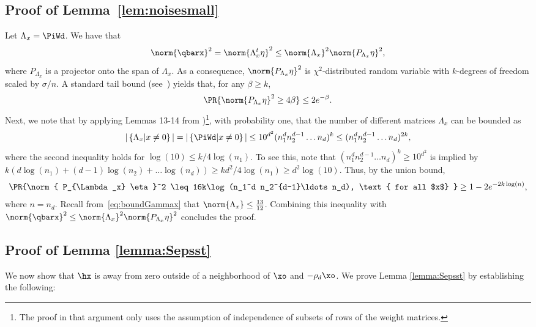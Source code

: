 

\subsection{Proof of Lemma~\ref{lem:noisesmall}}

Let $\Lambda_x = \PiWd$. 
We have that
\[
\norm{\qbarx}^2
=
\norm{ \Lambda_x^t \eta}^2
\leq
\norm{\Lambda_x}^2
\norm{ P_{\Lambda_x} \eta}^2,
\]
where $P_{\Lambda_x}$ is a projector onto the span of $\Lambda_x$. 
As a consequence, $\norm{ P_{\Lambda_x} \eta}^2$ is $\chi^2$-distributed random variable with $k$-degrees of freedom scaled by $\sigma/n$. A standard tail bound (see~\cite[p.~43]{boucheron_concentration_2013}) yields that, for any $\beta \geq k$, 
\[
\PR{\norm{ P_{\Lambda_x} \eta}^2 \geq 4 \beta}
\leq 
2e^{-\beta}.
\]
Next, we note that by applying Lemmas 13-14 from \cite[Proof of Lem.~15]{hand_global_2017})\footnote{The proof in that argument only uses the assumption of independence of subsets of rows of the weight matrices.}, with probability one, that the number of different matrices $\Lambda_x$ can be bounded as
\[
|\left\{
\Lambda_x | x \neq 0
\right\}|
=
|\left\{
\PiWd | x \neq 0
\right\}|
\leq
10^{d^2}(n_1^d n_2^{d-1}\ldots n_d)^k
\leq 
(n_1^d n_2^{d-1}\ldots n_d)^{2k},
\]
where the second inequality holds for 
$\log(10) \leq k/4 \log(n_1)$.
To see this, note that
$(n_1^d n_2^{d-1}\ldots n_d)^{k} \geq 10^{d^2}$
is implied by
$k( d\log(n_1)+ (d-1) \log(n_2) + \ldots \log(n_d))
\geq k d^2/4 \log(n_1) \geq d^2 \log(10)$. 
Thus, by the union bound, 
\[
\PR{\norm{ P_{\Lambda_x} \eta}^2 
\leq
16k\log(n_1^d n_2^{d-1}\ldots n_d),
\text{ for all $x$}
}
\geq 
1 - 2e^{- 2 k\log (n)},
\]
where $n = n_d$.
Recall from~\eqref{eq:boundGammax} that $\norm{\Lambda_x} \leq \frac{13}{12}$. 
Combining this inequality with 
$\norm{\qbarx}^2
\leq
\norm{\Lambda_x}^2
\norm{ P_{\Lambda_x} \eta}^2$ concludes the proof.



\subsection{Proof of Lemma \ref{lemma:Sepsst} } \label{sec:zeros-hxxo}

We now show that $\hx$ is away from zero outside of a neighborhood of $\xo$ and $-\rho_d \xo$.  We prove Lemma \ref{lemma:Sepsst} by establishing the following:

